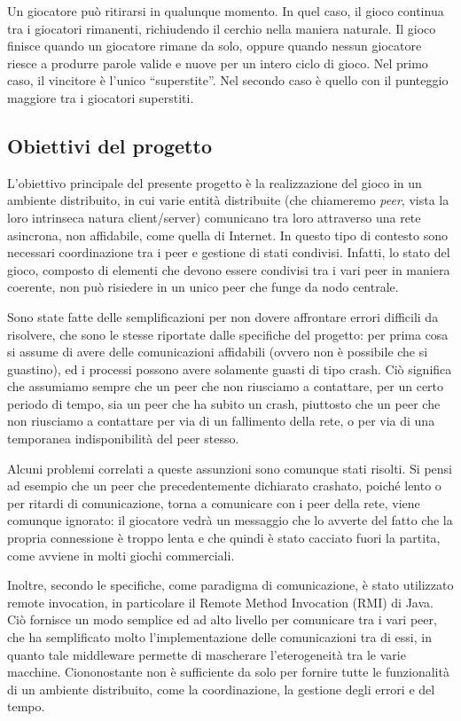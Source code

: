 \documentclass[10.5pt]{article}
\begin{document}
Un giocatore può ritirarsi in qualunque momento. In quel caso, il gioco continua tra i giocatori rimanenti, richiudendo il cerchio nella maniera naturale. Il gioco finisce quando un giocatore rimane da solo, oppure quando nessun giocatore riesce a produrre parole valide e nuove per un intero ciclo di gioco. Nel primo caso, il vincitore è l'unico ``superstite''. Nel secondo caso è quello con il punteggio maggiore tra i giocatori superstiti.

\subsection{Obiettivi del progetto}

L'obiettivo principale del presente progetto è la realizzazione del gioco in un ambiente distribuito, in cui varie entità distribuite (che chiameremo \emph{peer}, vista la loro intrinseca natura client/server) comunicano tra loro attraverso una rete asincrona, non affidabile, come quella di Internet. In questo tipo di contesto sono necessari coordinazione tra i peer e gestione di stati condivisi. Infatti, lo stato del gioco, composto di elementi che devono essere condivisi tra i vari peer in maniera coerente, non può risiedere in un unico peer che funge da nodo centrale.

Sono state fatte delle semplificazioni per non dovere affrontare errori difficili da risolvere, che sono le stesse riportate dalle specifiche del progetto: per prima cosa si assume di avere delle comunicazioni affidabili (ovvero non è possibile che si guastino), ed i processi possono avere solamente guasti di tipo crash. Ciò significa che assumiamo sempre che un peer che non riusciamo a contattare, per un certo periodo di tempo, sia un peer che ha subito un crash, piuttosto che un peer che non riusciamo a contattare per via di un fallimento della rete, o per via di una temporanea indisponibilità del peer stesso. 

Alcuni problemi correlati a queste assunzioni sono comunque stati risolti. Si pensi ad esempio che un peer che precedentemente dichiarato crashato, poiché lento o per ritardi di comunicazione, torna a comunicare con i peer della rete, viene comunque ignorato: il giocatore vedrà un messaggio che lo avverte del fatto che la propria connessione è troppo lenta e che quindi è stato cacciato fuori la partita, come avviene in molti giochi commerciali.

Inoltre, secondo le specifiche, come paradigma di comunicazione, è stato utilizzato remote invocation, in particolare il Remote Method Invocation (RMI) di Java. Ciò fornisce un modo semplice ed ad alto livello per comunicare tra i vari peer, che ha semplificato molto l'implementazione delle comunicazioni tra di essi, in quanto tale middleware permette di mascherare l'eterogeneità tra le varie macchine. Ciononostante non è sufficiente da solo per fornire tutte le funzionalità di un ambiente distribuito, come la coordinazione, la gestione degli errori e del tempo.
\end{document}
